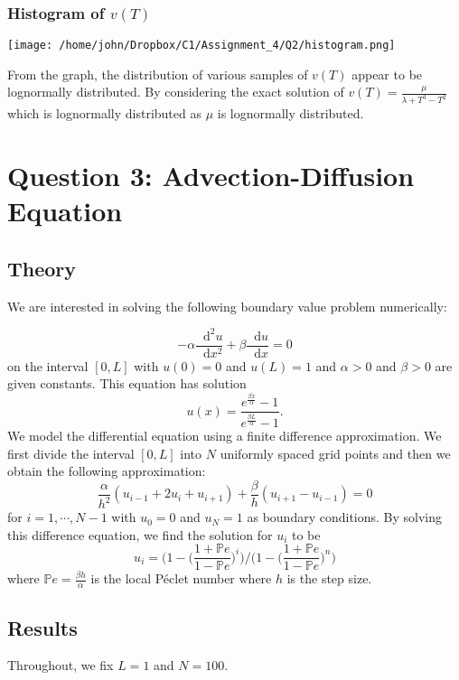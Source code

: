 \documentclass[letterpaper,12pt]{article}
\newcommand{\Prob}{\mathbb{P}}
\newcommand*{\diff}{\mathop{}\!\mathrm{d}}
\begin{document}
\subsubsection{Histogram of $v(T)$ }

\centerline{\texttt{[image: /home/john/Dropbox/C1/Assignment\_4/Q2/histogram.png]}}

From the graph, the distribution of various samples of $v(T)$ appear to be lognormally distributed. By considering the exact solution of $v(T) = \frac{\mu}{\lambda + T^3 - T^2}$ which is lognormally distributed as $\mu$ is lognormally distributed.



\section{Question 3: Advection-Diffusion Equation}

\subsection{Theory}

We are interested in solving the following boundary value problem numerically:

\[
-\alpha \frac{\diff^2 u}{\diff x^2 } + \beta \frac{\diff u}{\diff x } = 0
\]
on the interval $[0, L]$ with $u(0) = 0$ and $u(L) = 1$ and $\alpha > 0$ and $\beta > 0$ are given constants. This equation has solution
\[
u(x) = \frac{e^{\frac{\beta x}{\alpha}} - 1}{e^{\frac{\beta L}{\alpha}} - 1}.
\]
We model the differential equation using a finite difference approximation. We first divide the interval $[0 , L]$ into $N$ uniformly spaced grid points and then we obtain the following approximation:
\[
\frac{\alpha}{h^2}(u_{i - 1} + 2u_i + u_{i + 1}) + \frac{\beta}{h}(u_{i + 1} - u_{i - 1} ) = 0
\]
for $i = 1, \cdots, N -1$ with $u_0 = 0$ and $u_N = 1$ as boundary conditions. By solving this difference equation, we find the solution for $u_i$ to be
\[
u_i = \Bigg( 1 - \Big(\frac{1 + \Prob e}{1-\Prob e} \Big)^i \Bigg) /\Bigg( 1 - \Big(\frac{1 + \Prob e}{1-\Prob e} \Big)^n \Bigg)
\]
where $\Prob e = \frac{\beta h}{\alpha}$ is the local P\'{e}clet number where $h$ is the step size.

\subsection{Results}

Throughout, we fix $L = 1$ and $N = 100$.
\end{document}
